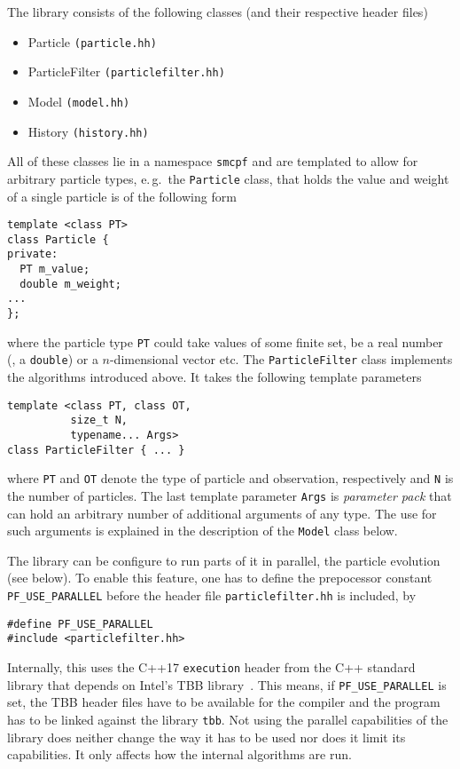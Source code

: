 The library consists of the following classes (and their respective
header files)
\begin{itemize}
\item Particle \texttt{(particle.hh)}
\item ParticleFilter \texttt{(particlefilter.hh)}
\item Model \texttt{(model.hh)}
\item History \texttt{(history.hh)}
\end{itemize}
All of these classes lie in a namespace \texttt{smcpf} and are
templated to allow for arbitrary particle types, e.\,g.\ the
\texttt{Particle} class, that holds the value and weight of a single
particle is of the following form
\begin{verbatim}
template <class PT> 
class Particle {
private:
  PT m_value;
  double m_weight;
...
}; 
\end{verbatim}
where the particle type \texttt{PT} could take values of some finite
set, be a real number (\ie, a \texttt{double}) or a $n$-dimensional
vector etc. The \texttt{ParticleFilter} class implements the
algorithms introduced above. It takes the following template
parameters
\begin{verbatim}
template <class PT, class OT, 
          size_t N,  
          typename... Args>
class ParticleFilter { ... }

\end{verbatim}
where \texttt{PT} and \texttt{OT} denote the type of particle and
observation, respectively and \texttt{N} is the number of
particles. The last template parameter \texttt{Args} is
\emph{parameter pack} that can hold an arbitrary number of additional
arguments of any type. The use for such arguments is explained in the
description of the \texttt{Model} class below.

The library can be configure to run parts of it in parallel, \eg the
particle evolution (see below). To enable this feature, one has to
define the prepocessor constant \texttt{PF\_USE\_PARALLEL} before the
header file \texttt{particlefilter.hh} is included, \eg by
\begin{verbatim}
#define PF_USE_PARALLEL
#include <particlefilter.hh>
\end{verbatim}

Internally, this uses the C++17 \texttt{execution} header from the C++
standard library that depends on Intel's TBB
library~\cite{intel}. This means, if \texttt{PF\_USE\_PARALLEL} is
set, the TBB header files have to be available for the compiler and
the program has to be linked against the library \texttt{tbb}. Not
using the parallel capabilities of the library does neither change the
way it has to be used nor does it limit its capabilities. It only
affects how the internal algorithms are run.

